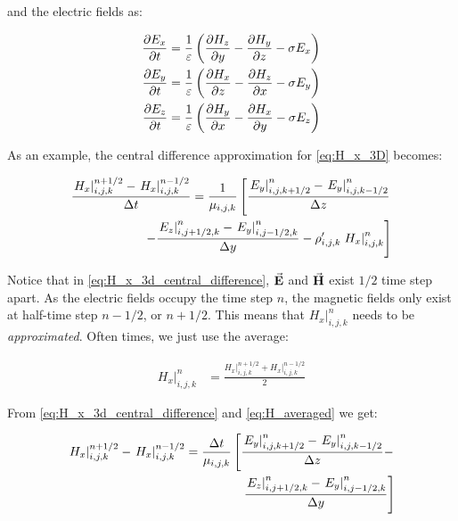 \documentclass[12pt]{article}
\begin{document}
and the electric fields as:

\begin{subequations}
  \begin{align}
    \pdv{E_x}{t} & =\frac{1}{\varepsilon}\left(\pdv{H_z}{y}-\pdv{H_y}{z}-\sigma E_{x}\right) \label{eq:E_x_3D} \\
    \pdv{E_y}{t} & =\frac{1}{\varepsilon}\left(\pdv{H_x}{z}-\pdv{H_z}{x}-\sigma E_{y}\right) \label{eq:E_y_3D} \\
    \pdv{E_z}{t} & =\frac{1}{\varepsilon}\left(\pdv{H_y}{x}-\pdv{H_x}{y}-\sigma E_{z}\right) \label{eq:E_z_3D}
  \end{align}
  \label{eq:electric}
\end{subequations}

As an example, the central difference approximation for \eqref{eq:H_x_3D} becomes:

\begin{align}
  \frac{\left. H_{x} \right|^{n + 1/2}_{i,j,k} - \left. H_{x} \right|^{n - 1/2}_{i,j,k}}{\Delta t}  = \frac{1}{\mu_{i,j,k}}
  \left[
  \frac{\left. E_y \right|^{n}_{i,j,k+1/2} - \left. E_y \right|^{n}_{i,j,k-1/2}}{\Delta z}  \right. \nonumber \\
  \left. - \frac{\left. E_z \right|^{n}_{i,j+1/2,k} - \left. E_y \right|^{n}_{i,j-1/2,k}}{\Delta y} - \rho'_{i,j,k} \left. H_x \right|^{n}_{i,j,k}
  \right]                                                        \label{eq:H_x_3d_central_difference}
\end{align}

Notice that in \eqref{eq:H_x_3d_central_difference}, $\va{E}$ and $\va{H}$ exist $1/2$ time step apart. As the electric fields occupy the time step $n$, the magnetic fields only exist at half-time step $n - 1/2$, or  $n + 1/2$. This means that $\left. H_x \right|^n_{i,j,k}$ needs to be \textit{approximated}. Often times, we just use the average:

\begin{align}
  \left. H_x \right|^n_{i,j,k} & = \frac{\left. H_x \right|^{n+1/2}_{i,j,k} + \left. H_x \right|^{n-1/2}_{i,j,k}}{2}
  \label{eq:H_averaged}
\end{align}

From \eqref{eq:H_x_3d_central_difference} and \eqref{eq:H_averaged} we get:

\begin{align}
  \left. H_{x} \right|^{n + 1/2}_{i,j,k} - \left. H_{x} \right|^{n - 1/2}_{i,j,k} = \frac{\Delta t}{\mu_{i,j,k}}
  \left[
  \frac{\left. E_y \right|^{n}_{i,j,k+1/2} - \left. E_y \right|^{n}_{i,j,k-1/2}}{\Delta z} - \right. \nonumber \\
  \left. \frac{\left. E_z \right|^{n}_{i,j+1/2,k} - \left. E_y \right|^{n}_{i,j-1/2,k}}{\Delta y}
  \right]
  \label{eq:solving_H_3d}
\end{align}
\end{document}
